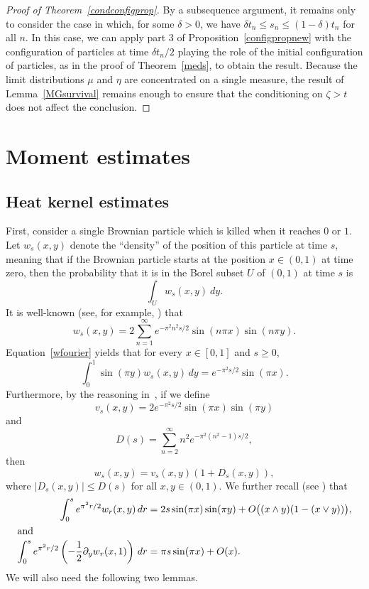\documentclass[10pt]{amsart}
\theoremstyle{definition}\newtheorem{defi}[theo]{Definition}\newtheorem{rema}[theo]{Remark}\newtheorem{exam}[theo]{Example}\newtheorem{exem}[theo]{Example}\newtheorem{nota}[theo]{Notation}
\newcommand{\1} {\mathds{1}}
\begin{document}
\begin{proof}[Proof of Theorem~\ref{condconfigprop}]
By a subsequence argument, it remains only to consider the case in which, for some $\delta > 0$, we have $\delta t_n \leq s_n \leq (1-\delta)t_n$ for all $n$. In this case, we can apply part 3 of Proposition~\ref{configpropnew} with the configuration of particles at time $\delta t_n/2$ playing the role of the initial configuration of particles, as in the proof of Theorem~\ref{meds}, to obtain the result. Because the limit distributions $\mu$ and $\eta$ are concentrated on a single measure, the result of Lemma~\ref{MGsurvival} remains enough to ensure that the conditioning on $\zeta > t$ does not affect the conclusion.
\end{proof}

\section{Moment estimates}\label{momsec}

\subsection{Heat kernel estimates} \label{sec:heat_kernel}

First, consider a single Brownian particle which is killed when it reaches $0$ or $1$. Let $w_s(x,y)$ denote the ``density'' of the position of this particle at time $s$, meaning that if the Brownian particle starts at the position $x \in (0, 1)$ at time zero, then the probability that it is in the Borel subset $U$ of $(0,1)$ at time $s$ is
\[
\int_U w_s(x,y) \: dy.
\]
It is well-known (see, for example, \cite[p.~188] {lawler}) that
\begin{equation}\label{wfourier}
w_s(x,y) = 2 \sum_{n=1}^{\infty} e^{-\pi^2 n^2 s/2} \sin (n \pi x) \sin (n \pi y).
\end{equation}
Equation~\eqref{wfourier} yields that for every $x\in[0,1]$ and $s\ge0$,
\begin{equation}\label{wsin}
\int_0^1 \sin(\pi y) w_s(x,y)\,dy = e^{-\pi^2 s/2}\sin(\pi x).
\end{equation}
Furthermore, by the reasoning in~\cite[Lemma~5]{bbs2}, if we define
\begin{equation}\label{vdef}
v_s(x,y) = 2 e^{-\pi^2 s/2} \sin(\pi x) \sin(\pi y)
\end{equation}
and
\begin{equation}\label{Ddef}
D(s) = \sum_{n=2}^{\infty} n^2 e^{-\pi^2 \left(n^2 - 1\right) s/2},
\end{equation}
then
\begin{equation}\label{udef}
w_s(x,y) = v_s(x,y)\left(1 + D_s(x,y)\right),
\end{equation}
where $|D_s(x,y)| \leq D(s)$ for all $x, y \in (0, 1)$. We further recall (see \cite[Lem\-ma~7.1]{maillard}) that
\begin{align}\label{wint}
\int_0^s e^{\pi^2 r/2}w_r(x,y)\,dr &= 2s\sin(\pi x)\sin(\pi y) + O\big((x\wedge y)(1-(x\vee y))\big),\\
\intertext{and}
\int_0^s e^{\pi^2 r/2}\left(-\frac 1 2 \partial_yw_r(x,1)\right)\,dr &= \pi s\sin(\pi x) + O(x).\label{wprimeint}
\end{align}
We will also need the following two lemmas.
\end{document}
